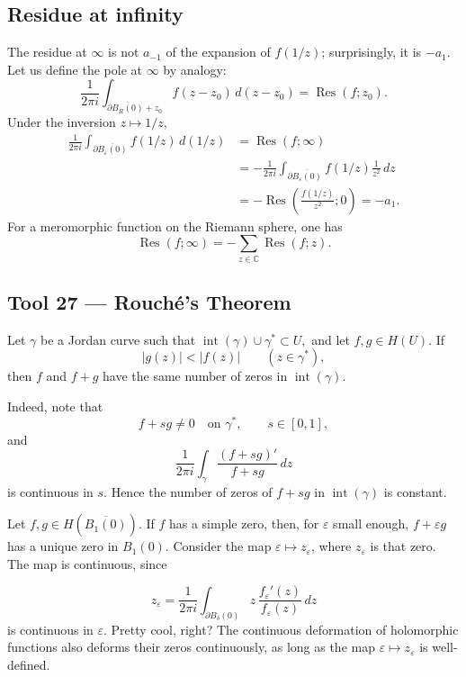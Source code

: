 \documentclass[11pt,a4paper]{article}
\begin{document}
\subsection*{Residue at infinity}
The residue at $\infty$ is not $a_{-1}$ of the expansion of $f(1/z)$; surprisingly, it is $-a_1$. Let us define the pole at $\infty$ by analogy:
\[
  \frac{1}{2\pi i}\int_{\partial\overline{B_R(0)}+z_0}
  f(z-z_0)\,d(z-z_0)=\operatorname{Res}(f;z_0).
\]
Under the inversion $z\mapsto1/z$,
\begin{align*}
  \frac{1}{2\pi i}\int_{\partial\overline{B_\varepsilon(0)}}
  f(1/z)\,d(1/z)
  &=\operatorname{Res}(f;\infty)\\
  &=-\frac{1}{2\pi i}\int_{\partial\overline{B_\varepsilon(0)}}
  f(1/z)\frac{1}{z^2}\,dz\\
  &=-\operatorname{Res}\!\left(\frac{f(1/z)}{z^2};0\right)
  =-a_1.
\end{align*}
For a meromorphic function on the Riemann sphere, one has
\[
  \operatorname{Res}(f;\infty)
  =-\sum_{z\in\mathbb C}\operatorname{Res}(f;z).
\]


\subsection*{Tool 27 — Rouch\'e's Theorem}

Let $\gamma$ be a Jordan curve such that \(\operatorname{int}(\gamma)\cup\gamma^*\subset U,\)
and let $f,g\in H(U)$. If
\[
  |g(z)|<|f(z)|\qquad(z\in\gamma^*),
\]
then $f$ and $f+g$ have the same number of zeros in $\operatorname{int}(\gamma)$.


Indeed, note that
\[
  f+sg\ne0\quad\text{on }\gamma^*,
  \qquad s\in[0,1],
\]
and
\[
  \frac{1}{2\pi i}\int_\gamma\frac{(f+sg)'}{f+sg}\,dz
\]
is continuous in $s$. Hence the number of zeros of $f+sg$ in $\operatorname{int}(\gamma)$ is constant.

Let $f,g\in H(\overline{B_1(0)})$. If $f$ has a simple zero, then, for $\varepsilon$ small enough, $f+\varepsilon g$ has a unique zero in $B_1(0)$. Consider the map $\varepsilon\mapsto z_\varepsilon$, where $z_\varepsilon$ is that zero. The map is continuous, since

\[
  z_\varepsilon
  =\frac{1}{2\pi i}\int_{\partial B_\delta(0)}
  z\,\frac{f_\varepsilon'(z)}{f_\varepsilon(z)}\,dz
\]
is continuous in $\varepsilon$. Pretty cool, right? The continuous deformation of holomorphic functions also deforms their zeros continuously, as long as the map $\varepsilon\mapsto z_\varepsilon$ is well-defined.
\end{document}
